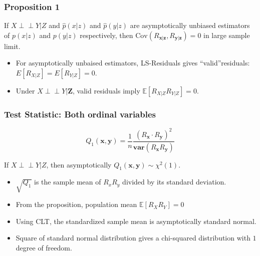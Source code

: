 \documentclass{beamer}
\def\ci{\perp\!\!\!\!\!\perp}
\begin{document}
\begin{frame}
	\frametitle{Proposition 1}
	If $ X \ci Y | Z $ and $ \hat{p}(x|z) $ and $ \hat{p}(y|z) $ are asymptotically
	unbiased estimators of $ p(x|z) $ and $ p(y|z) $ respectively, then 
	$ \mathrm{Cov}(R_{\bm{x}|\bm{z}}, R_{\bm{y}|\bm{z}}) = 0 $ in large sample limit.	
	\vspace{1em}

	\begin{itemize}
		\setlength\itemsep{1em}
		\item For asymptotically unbaised estimators, LS-Residuals
			gives ``valid''residuals: $ E[R_{X|Z}] = E[R_{Y|Z}] = 0
			$.
		\item Under $ X \ci Y | \bm{Z} $, valid
			residuals imply $ \mathbb{E}[R_{X|Z} R_{Y|Z}] = 0 $.
	\end{itemize}
\end{frame}

\begin{frame}
	\frametitle{Test Statistic: Both ordinal variables}
	$$ Q_1(\bm{x}, \bm{y}) = \frac{1}{n} \frac{(R_{\bm{x}} \cdot R_{\bm{y}})^2}{\bm{var}(R_{\bm{x}} R_{\bm{y}})} $$

	If $ X \ci Y | Z $, then asymptotically $ Q_1(\bm{x}, \bm{y}) \sim \chi^2(1) $.

	\begin{itemize}
		\setlength\itemsep{1em}
		\item $ \sqrt{Q_1} $ is the sample mean of $ R_x R_y $ divided by its
			standard deviation.
		\item From the proposition, population mean $ \mathbb{E}[R_X R_Y] = 0 $
		\item Using CLT, the standardized sample mean is asymptotically
			standard normal.
		\item Square of standard normal distribution gives a
			chi-squared distribution with $ 1 $ degree of freedom.
	\end{itemize}
\end{frame}
\end{document}
